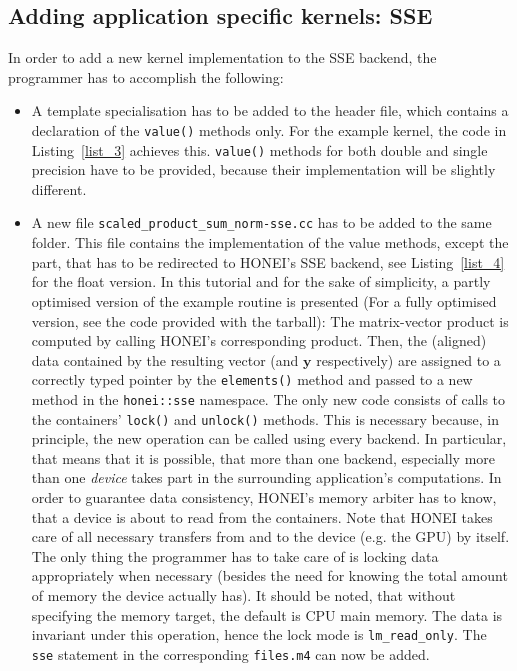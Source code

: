 \documentclass{article}
\begin{document}
\FloatBarrier
\subsection{Adding application specific kernels: SSE}\label{sec:sse}
In order to add a new kernel implementation to the SSE backend, the programmer has to accomplish the following:
\begin{itemize}
\item{A template specialisation has to be added to the header file, which contains a declaration of the \texttt{value()} methods only. For the example kernel, the code in Listing~\ref{list_3} achieves this. \texttt{value()} methods for both double and single precision have to be provided, because their implementation will be slightly different.}
\item{A new file \texttt{scaled\_product\_sum\_norm-sse.cc} has to be added to the same folder. This file contains the implementation of the value methods, except the part, that has to be redirected to HONEI's SSE backend, see Listing~\ref{list_4} for the float version. In this tutorial and for the sake of simplicity, a partly optimised version of the example routine is presented (For a fully optimised version,  see the code provided with the tarball): The matrix-vector product is computed by calling HONEI's corresponding product. Then, the (aligned) data contained by the resulting vector (and $\mathbf{y}$ respectively) are assigned to a correctly typed pointer by the \texttt{elements()} method and passed to a new method in the \texttt{honei::sse} namespace. The only new code consists of calls to the containers' \texttt{lock()} and \texttt{unlock()} methods. This is necessary because, in principle, the new operation can be called using every backend. In particular, that means that it is possible, that more than one backend, especially more than one \emph{device} takes part in the surrounding application's computations. In order to guarantee data consistency, HONEI's memory arbiter has to know, that a device is about to read from the containers. Note that HONEI takes care of all necessary transfers from and to the device (e.g. the GPU) by itself. The only thing the programmer has to take care of is locking data appropriately when necessary (besides the need for knowing the total amount of memory the device actually has). It should be noted, that without specifying the memory target, the default is CPU main memory. The data is invariant under this operation, hence the lock mode is \texttt{lm\_read\_only}. The \texttt{sse} statement in the corresponding \texttt{files.m4} can now be added.}

\end{itemize}
\end{document}
